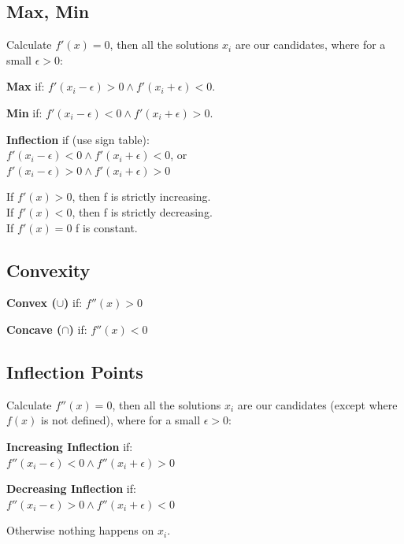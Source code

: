 \documentclass[8pt,a4paper]{extarticle}     %
\theoremstyle{definition}
\theoremstyle{definition}
\theoremstyle{definition}
\begin{document}
\begin{multicols}{4}
\subsection{Max, Min}
Calculate $f'(x) = 0$, then all the solutions $x_i$ are our candidates, where for a small $\epsilon > 0$:
\begin{bulletlist}
	\item \textbf{Max} if: $f'(x_i-\epsilon) > 0 \land f'(x_i+\epsilon) < 0$.
	\item \textbf{Min} if: $f'(x_i-\epsilon) < 0 \land f'(x_i+\epsilon) > 0$.
	\item \textbf{Inflection} if (use sign table): \\
	$f'(x_i-\epsilon) < 0 \land f'(x_i+\epsilon) < 0$, or\\
	$f'(x_i-\epsilon) > 0 \land f'(x_i+\epsilon) > 0$
\end{bulletlist}
If $f'(x)>0$, then f is strictly increasing. \\
If $f'(x)<0$, then f is strictly decreasing. \\
If $f'(x)=0$ f is constant.

\subsection{Convexity}
\begin{bulletlist}
	\item \textbf{Convex ($\cup$)} if: $f''(x) > 0$
	\item \textbf{Concave ($\cap$)} if: $f''(x) < 0$
\end{bulletlist}

\subsection{Inflection Points}
Calculate $f''(x) = 0$, then all the solutions $x_i$ are our candidates (except where $f(x)$ is not defined), where for a small $\epsilon > 0$:
\begin{bulletlist}
	\item \textbf{Increasing Inflection} if: \\$f''(x_i-\epsilon) < 0 \land f''(x_i+\epsilon) > 0$
	\item \textbf{Decreasing Inflection} if: \\$f''(x_i-\epsilon) > 0 \land f''(x_i+\epsilon) < 0$
	\item Otherwise nothing happens on $x_i$.
\end{bulletlist}


\end{multicols}
\end{document}
